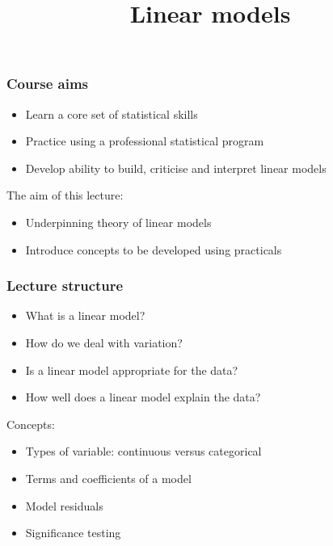 \documentclass[aspectratio=43]{beamer}
\title{Linear models}
\date{}
\begin{document}


\frame{\titlepage}

\frame
{
  \frametitle{Course aims}

  \begin{itemize}
  \item Learn a core set of statistical skills 
  \item Practice using a professional statistical program
  \item Develop ability to build, criticise and interpret linear models
  \end{itemize}
  \vspace{12pt}
  The aim of this lecture:
  \begin{itemize}
  \item Underpinning theory of linear models
  \item Introduce concepts to be developed using practicals
  \end{itemize}
}





\frame
{
  \frametitle{Lecture structure}



  \begin{itemize}
  \item What is a linear model?
  \item How do we deal with variation?  
  \item Is a linear model appropriate for the data?
  \item How well does a linear model explain the data?
  \end{itemize}

  \vspace{12pt}
  Concepts:
  \begin{itemize}
  \item Types of variable: continuous versus categorical 
  \item Terms and coefficients of a model
  \item Model residuals
  \item Significance testing
  \end{itemize}

}
\end{document}
